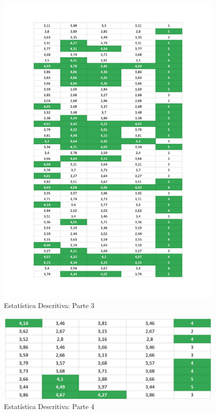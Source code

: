 \begin{figure}[H]
	\centering
	\includegraphics[width=1\linewidth]{imagens/findMusicResultados3.jpg}
	\caption[Estatística Descritiva: Parte 3]{Estatística Descritiva: Parte 3}
    \label{fig:findMusicEstatistica3}
\end{figure}

\begin{figure}[H]
	\centering
	\includegraphics[width=.8\linewidth]{imagens/findMusicResultados4.jpg}
	\caption[Estatística Descritiva: Parte 4]{Estatística Descritiva: Parte 4}
    \label{fig:findMusicEstatistica4}
\end{figure}

